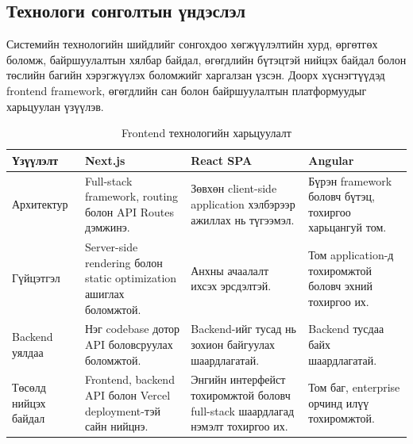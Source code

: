 \subsection{Технологи сонголтын үндэслэл}

Системийн технологийн шийдлийг сонгохдоо хөгжүүлэлтийн хурд, өргөтгөх
боломж, байршуулалтын хялбар байдал, өгөгдлийн бүтэцтэй нийцэх байдал
болон төслийн багийн хэрэгжүүлэх боломжийг харгалзан үзсэн. Доорх
хүснэгтүүдэд frontend framework, өгөгдлийн сан болон байршуулалтын
платформуудыг харьцуулан үзүүлэв.

\begin{table}[H]
\centering
\caption{Frontend технологийн харьцуулалт}
\label{tab:frontend-tech-comparison}
{\small
\setlength{\tabcolsep}{4pt}
\renewcommand{\arraystretch}{1.25}
\begin{tabular}{|p{2.7cm}|p{3.3cm}|p{3.3cm}|p{3.3cm}|}
\hline
\textbf{Үзүүлэлт} & \textbf{Next.js} & \textbf{React SPA} & \textbf{Angular} \\
\hline
Архитектур & Full-stack framework, routing болон API Routes дэмжинэ. & Зөвхөн client-side application хэлбэрээр ажиллах нь түгээмэл. & Бүрэн framework боловч бүтэц, тохиргоо харьцангуй том. \\
\hline
Гүйцэтгэл & Server-side rendering болон static optimization ашиглах боломжтой. & Анхны ачаалалт ихсэх эрсдэлтэй. & Том application-д тохиромжтой боловч эхний тохиргоо их. \\
\hline
Backend уялдаа & Нэг codebase дотор API боловсруулах боломжтой. & Backend-ийг тусад нь зохион байгуулах шаардлагатай. & Backend тусдаа байх шаардлагатай. \\
\hline
Төсөлд нийцэх байдал & Frontend, backend API болон Vercel deployment-тэй сайн нийцнэ. & Энгийн интерфейст тохиромжтой боловч full-stack шаардлагад нэмэлт тохиргоо их. & Том баг, enterprise орчинд илүү тохиромжтой. \\
\hline
\end{tabular}
}
\end{table}

